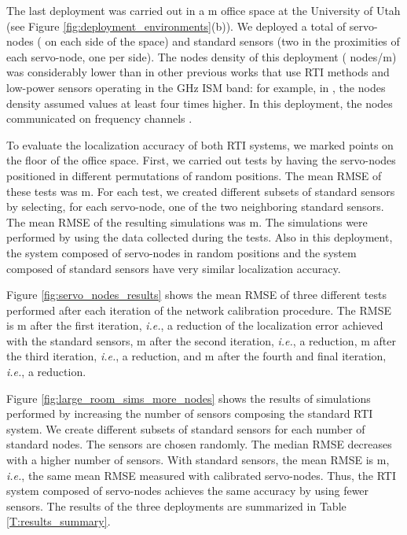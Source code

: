 \documentclass[conference]{IEEEtran}
\begin{document}
The last deployment was carried out in a  m office space at the University of Utah (see Figure \ref{fig:deployment_environments}(b)). We deployed a total of  servo-nodes ( on each side of the space) and  standard sensors (two in the proximities of each servo-node, one per side). The nodes density of this deployment ( nodes/m) was considerably lower than in other previous works that use RTI methods and low-power sensors operating in the  GHz ISM band: for example, in \cite{multi_scale_arxiv,Wilson_SkewL_2011,MASS_2012,Grandma_2012,MTT_2013}, the nodes density assumed values at least four times higher. In this deployment, the nodes communicated on frequency channels .

To evaluate the localization accuracy of both RTI systems, we marked  points on the floor of the office space. First, we carried out  tests by having the  servo-nodes positioned in  different permutations of random positions. The mean RMSE of these tests was  m. For each test, we created  different subsets of  standard sensors by selecting, for each servo-node, one of the two neighboring standard sensors. The mean RMSE of the resulting  simulations was  m. The simulations were performed by using the data collected during the tests. Also in this deployment, the system composed of servo-nodes in random positions and the system composed of standard sensors have very similar localization accuracy.

Figure \ref{fig:servo_nodes_results} shows the mean RMSE of three different tests performed after each iteration of the network calibration procedure. The RMSE is  m after the first iteration, \emph{i.e.}, a  reduction of the localization error achieved with the standard sensors,  m after the second iteration, \emph{i.e.}, a  reduction,  m after the third iteration, \emph{i.e.}, a  reduction, and  m after the fourth and final iteration, \emph{i.e.}, a  reduction.

Figure \ref{fig:large_room_sims_more_nodes} shows the results of simulations performed by increasing the number of sensors composing the standard RTI system. We create  different subsets of standard sensors for each number of standard nodes. The sensors are chosen randomly. The median RMSE decreases with a higher number of sensors. With  standard sensors, the mean RMSE is  m, \emph{i.e.}, the same mean RMSE measured with  calibrated servo-nodes. Thus, the RTI system composed of servo-nodes achieves the same accuracy by using  fewer sensors. The results of the three deployments are summarized in Table \ref{T:results_summary}.
\end{document}

